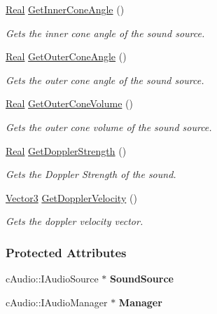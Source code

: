 \begin{DoxyCompactItemize}
\hyperlink{namespacephys_af7eb897198d265b8e868f45240230d5f}{Real} \hyperlink{classphys_1_1Sound_a5e39752133cd5d8d160455bbbcb360fd}{GetInnerConeAngle} ()
\begin{DoxyCompactList}\small\item\em Gets the inner cone angle of the sound source. \item\end{DoxyCompactList}\item 
\hyperlink{namespacephys_af7eb897198d265b8e868f45240230d5f}{Real} \hyperlink{classphys_1_1Sound_ad39ca4504655a777283fd2e238b729d1}{GetOuterConeAngle} ()
\begin{DoxyCompactList}\small\item\em Gets the outer cone angle of the sound source. \item\end{DoxyCompactList}\item 
\hyperlink{namespacephys_af7eb897198d265b8e868f45240230d5f}{Real} \hyperlink{classphys_1_1Sound_a2607037d0c40d32f402d0ebb98586a00}{GetOuterConeVolume} ()
\begin{DoxyCompactList}\small\item\em Gets the outer cone volume of the sound source. \item\end{DoxyCompactList}\item 
\hyperlink{namespacephys_af7eb897198d265b8e868f45240230d5f}{Real} \hyperlink{classphys_1_1Sound_a894e1390d76c6a6e79404569afeaf168}{GetDopplerStrength} ()
\begin{DoxyCompactList}\small\item\em Gets the Doppler Strength of the sound. \item\end{DoxyCompactList}\item 
\hyperlink{classphys_1_1Vector3}{Vector3} \hyperlink{classphys_1_1Sound_a9d4e845004b59ba5bdc066f7f12ff7d7}{GetDopplerVelocity} ()
\begin{DoxyCompactList}\small\item\em Gets the doppler velocity vector. \item\end{DoxyCompactList}\end{DoxyCompactItemize}
\subsubsection*{Protected Attributes}
\begin{DoxyCompactItemize}
\item 
\hypertarget{classphys_1_1Sound_a7cd63202ea3dbc96c6f466a60b89b0fe}{
cAudio::IAudioSource $\ast$ {\bfseries SoundSource}}
\label{dc/d2f/classphys_1_1Sound_a7cd63202ea3dbc96c6f466a60b89b0fe}

\item 
\hypertarget{classphys_1_1Sound_a84b31e91bd1363ba430a51f579a07e0b}{
cAudio::IAudioManager $\ast$ {\bfseries Manager}}
\label{dc/d2f/classphys_1_1Sound_a84b31e91bd1363ba430a51f579a07e0b}

\end{DoxyCompactItemize}
